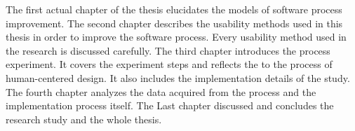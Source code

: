 \documentclass[12pt,a4paper,oneside,pdftex]{report}
\begin{document}
The first actual chapter of the thesis elucidates the models of software process improvement. The second chapter describes the usability methods used in this thesis in order to improve the software process. Every usability method used in the research is discussed carefully. The third chapter introduces the process experiment. It covers the experiment steps and reflects the to the process of human-centered design. It also includes the implementation details of the study. The fourth chapter analyzes the data acquired from the process and the implementation process itself. The Last chapter discussed and concludes the research study and the whole thesis.

    
    









\end{document}
